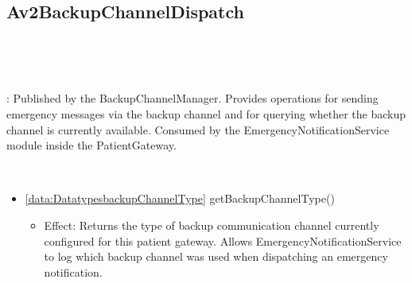   \subsection{Av2BackupChannelDispatch}\label{int:InterfacesAv2BackupChannelDispatch}
    \begin{description}
      \item[Provided by:] \iconcomponent{}~
      \item[Required by:] \iconcomponent{}~ 
           \item[Description]: Published by the BackupChannelManager. Provides operations for sending emergency messages via the backup channel and for querying whether the backup channel is currently available. Consumed by the EmergencyNotificationService module inside the PatientGateway.
      \item[Operations:] ~
    \begin{itemize}[noitemsep,nolistsep,leftmargin=-.25cm]
      \item \textsf{\ref{data:DatatypesbackupChannelType} getBackupChannelType()}
        \begin{itemize}[noitemsep,nolistsep]
           \item Effect: Returns the type of backup communication channel currently configured for this patient gateway. Allows EmergencyNotificationService to log which backup channel was used when dispatching an emergency notification.
 

\end{itemize}
\end{itemize}
\end{description}
